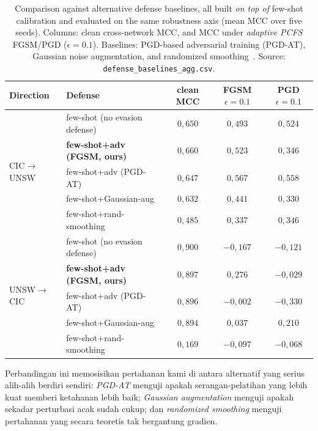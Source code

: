 \documentclass[11pt,a4paper]{article}
\begin{document}
\begin{table}[h]
\centering
\caption{Comparison against alternative defense baselines, all built \emph{on top of}
few-shot calibration and evaluated on the same robustness axis (mean MCC over five
seeds). Columns: clean cross-network MCC, and MCC under \emph{adaptive PCFS} FGSM/PGD
($\epsilon{=}0.1$). Baselines: PGD-based adversarial training (PGD-AT), Gaussian
noise augmentation, and randomized smoothing~\cite{cohen2019smoothing}. Source:
\texttt{defense\_baselines\_agg.csv}.}
\label{tab:defense_baselines}
\small
\begin{tabular}{llccc}
\toprule
Direction & Defense & clean MCC & FGSM $\epsilon{=}0.1$ & PGD $\epsilon{=}0.1$ \\
\midrule
\multirow{5}{*}{CIC$\rightarrow$UNSW}
 & few-shot (no evasion defense)       & $0{,}650$ & $0{,}493$ & $0{,}524$ \\
 & \textbf{few-shot+adv (FGSM, ours)}  & $0{,}660$ & $0{,}523$ & $0{,}346$ \\
 & few-shot+adv (PGD-AT)               & $0{,}647$ & $0{,}567$ & $0{,}558$ \\
 & few-shot+Gaussian-aug               & $0{,}632$ & $0{,}441$ & $0{,}330$ \\
 & few-shot+rand-smoothing             & $0{,}485$ & $0{,}337$ & $0{,}346$ \\
\midrule
\multirow{5}{*}{UNSW$\rightarrow$CIC}
 & few-shot (no evasion defense)       & $0{,}900$ & $-0{,}167$ & $-0{,}121$ \\
 & \textbf{few-shot+adv (FGSM, ours)}  & $0{,}897$ & $0{,}276$ & $-0{,}029$ \\
 & few-shot+adv (PGD-AT)               & $0{,}896$ & $-0{,}002$ & $-0{,}330$ \\
 & few-shot+Gaussian-aug               & $0{,}894$ & $0{,}037$ & $0{,}210$ \\
 & few-shot+rand-smoothing             & $0{,}169$ & $-0{,}097$ & $-0{,}068$ \\
\bottomrule
\end{tabular}
\end{table}

\noindent Perbandingan ini memosisikan pertahanan kami di antara alternatif yang
serius alih-alih berdiri sendiri: \emph{PGD-AT} menguji apakah serangan-pelatihan
yang lebih kuat memberi ketahanan lebih baik; \emph{Gaussian augmentation} menguji
apakah sekadar perturbasi acak sudah cukup; dan \emph{randomized smoothing} menguji
pertahanan yang secara teoretis tak bergantung gradien.
\end{document}
